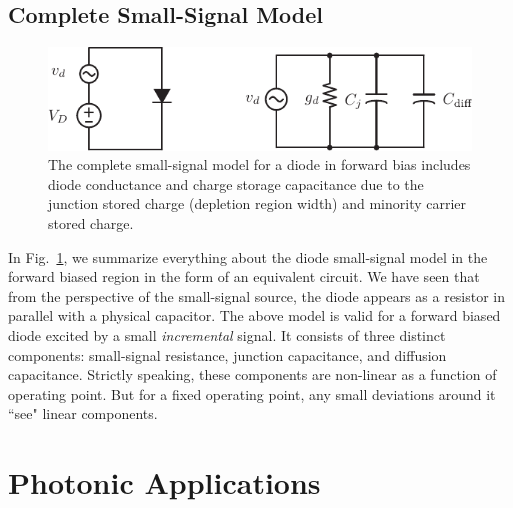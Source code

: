 \subsection{Complete Small-Signal Model}
\begin{figure}[tb]
\begin{center}
\includegraphics[width=.75\columnwidth]{diode_ss_model}
\end{center}
\caption{The complete small-signal model for a diode in forward bias includes diode conductance and charge storage capacitance due to the junction stored charge (depletion region width) and minority carrier stored charge. }
\label{fig:diode_ss_model}
\end{figure}

In Fig.~\ref{fig:diode_ss_model}, we summarize everything about the diode small-signal model in the forward biased region in the form of an equivalent circuit.  We have seen that  from the perspective of the small-signal source, the diode appears as a resistor in parallel with a physical capacitor.    The above model is valid for a forward biased diode excited by a small \emph{incremental} signal.   It consists of three distinct components:  small-signal resistance, junction capacitance, and diffusion capacitance.  Strictly speaking, these components are non-linear as a function of operating point.  But for a fixed operating point, any small deviations around it ``see" linear components.
\section{Photonic Applications}
